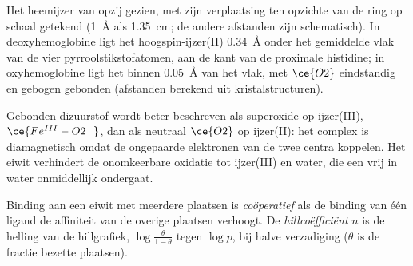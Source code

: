 \begin{omfigure}

{\small Het heemijzer van opzij gezien, met zijn verplaatsing ten opzichte
van de ring op schaal getekend (1~\AA{} als 1.35~cm; de andere afstanden zijn schematisch). In deoxyhemoglobine ligt het hoogspin-ijzer(II)
\qty{0.34}{\angstrom} onder het gemiddelde vlak van de vier pyrroolstikstofatomen, aan de kant van de
proximale histidine; in oxyhemoglobine ligt het binnen \qty{0.05}{\angstrom} van het vlak, met $\ce{O2}$
eindstandig en gebogen gebonden (afstanden berekend uit kristalstructuren).}
\end{omfigure}

Gebonden dizuurstof wordt beter beschreven als superoxide op ijzer(III), $\ce{Fe^{III}-O2^-}$, dan als
neutraal $\ce{O2}$ op ijzer(II): het complex is diamagnetisch omdat de ongepaarde
elektronen van de twee centra koppelen. Het eiwit verhindert de
onomkeerbare oxidatie tot ijzer(III) en water, die een vrij  in water
onmiddellijk ondergaat.

\begin{definition}\label{def:b3:bioinorganic:cooperativity}
Binding aan een eiwit met meerdere plaatsen is
\emph{coöperatief}
als de binding van één ligand de affiniteit van de overige plaatsen
verhoogt. De \emph{hillcoëfficiënt} $n$ is de helling van de
hillgrafiek, $\log\frac{\theta}{1 - \theta}$ tegen $\log p$, bij halve verzadiging ($\theta$ is de fractie bezette
plaatsen).
\end{definition}


